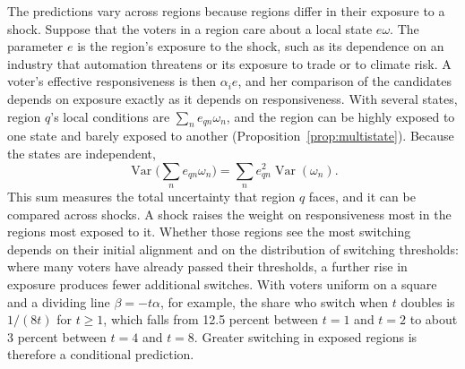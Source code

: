 \documentclass[12pt,letterpaper]{article}
\begin{document}
The predictions vary across regions because regions differ in their exposure to a shock. Suppose that the voters in a region care about a local state $e\omega$. The parameter $e$ is the region's exposure to the shock, such as its dependence on an industry that automation threatens or its exposure to trade or to climate risk. A voter's effective responsiveness is then $\alpha_ie$, and her comparison of the candidates depends on exposure exactly as it depends on responsiveness. With several states, region $q$'s local conditions are $\sum_ne_{qn}\omega_n$, and the region can be highly exposed to one state and barely exposed to another (Proposition~\ref{prop:multistate}). Because the states are independent,
\[
\operatorname{Var}\Big(\sum_ne_{qn}\omega_n\Big)=\sum_ne_{qn}^2\operatorname{Var}(\omega_n).
\]
This sum measures the total uncertainty that region $q$ faces, and it can be compared across shocks. A shock raises the weight on responsiveness most in the regions most exposed to it. Whether those regions see the most switching depends on their initial alignment and on the distribution of switching thresholds: where many voters have already passed their thresholds, a further rise in exposure produces fewer additional switches. With voters uniform on a square and a dividing line $\beta=-t\alpha$, for example, the share who switch when $t$ doubles is $1/(8t)$ for $t\ge1$, which falls from 12.5 percent between $t=1$ and $t=2$ to about 3 percent between $t=4$ and $t=8$. Greater switching in exposed regions is therefore a conditional prediction.
\end{document}
